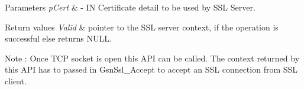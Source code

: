 \begin{DoxyParams}{Parameters}
{\em pCert} & -\/ IN Certificate detail to be used by SSL Server.\\
\hline
\end{DoxyParams}

\begin{DoxyRetVals}{Return values}
{\em Valid} & pointer to the SSL server context, if the operation is successful else returns NULL.\\
\hline
\end{DoxyRetVals}
\begin{DoxyNote}{Note}
: Once TCP socket is open this API can be called. The context returned by this API has to passed in GsnSsl\_\-Accept to accept an SSL connection from SSL client. 
\end{DoxyNote}
